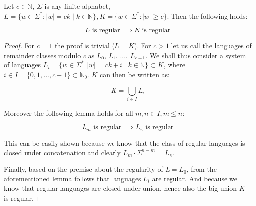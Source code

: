 \documentclass{article}
\title{}
\author{Adam Fiedler}
\begin{document}
\maketitle

Let $c \in \mathbb{N}$, $\Sigma$ is any finite alphabet, $L = \{w \in \Sigma^*: |w| = ck \mid k \in \mathbb{N}\}, K = \{w \in \Sigma^*: |w| \geq c\}$. Then the following holds:

\[L \text{ is regular} \implies K \text{ is regular}\]

\begin{proof}
For $c = 1$ the proof is trivial ($L = K$). For $c > 1$ let us call the languages of remainder classes modulo $c$ as $L_{0}$, $L_{1}$, ..., $L_{c-1}$. We shall thus consider a system of languages $L_i = \{w \in \Sigma^*: |w| = ck + i \mid k \in \mathbb{N}\} \subset K$, where $i \in I = \{0, 1, ..., c-1\} \subset \mathbb{N}_0$. $K$ can then be written as:

\[ K = \bigcup\limits_{i \in I} L_{i} \]

\noindent Moreover the following lemma holds for all $m, n \in I, m \leq n$:

\[ L_m\text{ is regular} \implies L_n\text{ is regular} \]

\noindent This can be easily shown because we know that the class of regular languages is closed under concatenation and clearly $L_m \cdot \Sigma^{n - m} = L_n$.\newline

Finally, based on the premise about the regularity of $L = L_0$, from the aforementioned lemma follows that languages $L_i$ are regular. And because we know that regular languages are closed under union, hence also the big union $K$ is regular.

\end{proof}
\end{document}
